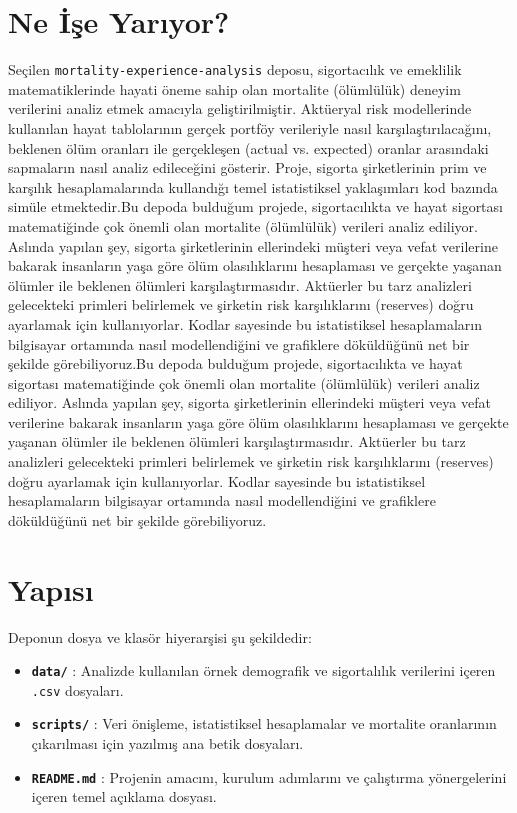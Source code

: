 \documentclass[12pt,a4paper]{article}
\begin{document}
\section{Ne İşe Yarıyor?}
Seçilen \texttt{mortality-experience-analysis} deposu, sigortacılık ve emeklilik matematiklerinde hayati öneme sahip olan mortalite (ölümlülük) deneyim verilerini analiz etmek amacıyla geliştirilmiştir. Aktüeryal risk modellerinde kullanılan hayat tablolarının gerçek portföy verileriyle nasıl karşılaştırılacağını, beklenen ölüm oranları ile gerçekleşen (actual vs. expected) oranlar arasındaki sapmaların nasıl analiz edileceğini gösterir. Proje, sigorta şirketlerinin prim ve karşılık hesaplamalarında kullandığı temel istatistiksel yaklaşımları kod bazında simüle etmektedir.Bu depoda bulduğum projede, sigortacılıkta ve hayat sigortası matematiğinde çok önemli olan mortalite (ölümlülük) verileri analiz ediliyor. Aslında yapılan şey, sigorta şirketlerinin ellerindeki müşteri veya vefat verilerine bakarak insanların yaşa göre ölüm olasılıklarını hesaplaması ve gerçekte yaşanan ölümler ile beklenen ölümleri karşılaştırmasıdır. Aktüerler bu tarz analizleri gelecekteki primleri belirlemek ve şirketin risk karşılıklarını (reserves) doğru ayarlamak için kullanıyorlar. Kodlar sayesinde bu istatistiksel hesaplamaların bilgisayar ortamında nasıl modellendiğini ve grafiklere döküldüğünü net bir şekilde görebiliyoruz.Bu depoda bulduğum projede, sigortacılıkta ve hayat sigortası matematiğinde çok önemli olan mortalite (ölümlülük) verileri analiz ediliyor. Aslında yapılan şey, sigorta şirketlerinin ellerindeki müşteri veya vefat verilerine bakarak insanların yaşa göre ölüm olasılıklarını hesaplaması ve gerçekte yaşanan ölümler ile beklenen ölümleri karşılaştırmasıdır. Aktüerler bu tarz analizleri gelecekteki primleri belirlemek ve şirketin risk karşılıklarını (reserves) doğru ayarlamak için kullanıyorlar. Kodlar sayesinde bu istatistiksel hesaplamaların bilgisayar ortamında nasıl modellendiğini ve grafiklere döküldüğünü net bir şekilde görebiliyoruz.


\section{Yapısı}
Deponun dosya ve klasör hiyerarşisi şu şekildedir:
\begin{itemize}
    \item \textbf{\texttt{data/}} : Analizde kullanılan örnek demografik ve sigortalılık verilerini içeren \texttt{.csv} dosyaları.
    \item \textbf{\texttt{scripts/}} : Veri önişleme, istatistiksel hesaplamalar ve mortalite oranlarının çıkarılması için yazılmış ana betik dosyaları.
    \item \textbf{\texttt{README.md}} : Projenin amacını, kurulum adımlarını ve çalıştırma yönergelerini içeren temel açıklama dosyası.
\end{itemize}
\end{document}
